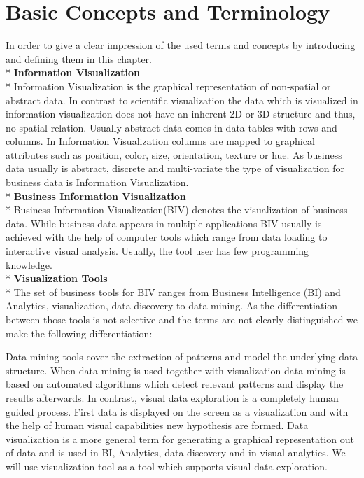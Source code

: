 \chapter{Basic Concepts and Terminology}
\label{concepts}
In order to give a clear impression of the used terms and concepts by introducing and defining them in this chapter.\\*
\textbf{Information Visualization}\\*
Information Visualization is the graphical representation of non-spatial or abstract data\cite{Keim}. In contrast to scientific visualization the data which is visualized in information visualization does not have an inherent 2D or 3D structure\cite{Shneiderman2008} and thus, no spatial relation. Usually abstract data comes in data tables with rows and columns. In Information Visualization columns are mapped to graphical attributes such as position, color, size, orientation, texture or hue. 
As business data usually is abstract, discrete and multi-variate\cite{Tegarden1999} the type of visualization for business data is Information Visualization.\\*
\textbf{Business Information Visualization}\label{BIV}\\*
Business Information Visualization(BIV) denotes the visualization of business data. While business data appears in multiple applications BIV usually is achieved with the help of computer tools which range from data loading to interactive visual analysis. Usually, the tool user has few programming knowledge. \\*
\textbf{Visualization Tools}\\*
The set of business tools for BIV ranges from Business Intelligence (BI) and Analytics, visualization, data discovery to data mining. As the differentiation between those tools is not selective and the terms are not clearly distinguished we make the following differentiation:

Data mining tools cover the extraction of patterns and model the underlying data structure\cite{FerreiradeOliveira2003}. When data mining is used together with visualization data mining is based on automated algorithms which detect relevant patterns and display the results afterwards. In contrast, visual data exploration is a completely human guided process\cite{FerreiradeOliveira2003}. First data is displayed on the screen as a visualization and with the help of human visual capabilities new hypothesis are formed. Data visualization is a more general term for generating a graphical representation out of data and is used in BI, Analytics, data discovery and in visual analytics. We will use visualization tool as a tool which supports visual data exploration. 


